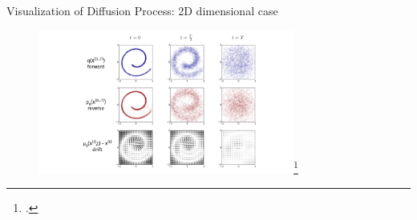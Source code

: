 \documentclass[aspectratio=169, 10pt]{beamer}
\theoremstyle{definition}
\begin{document}
\begin{frame}{Visualization of Diffusion Process: 2D dimensional case}
  \begin{figure}[h]
    \centering
    \includegraphics[width=0.75\textwidth]{./pic/summary-forw-reverse.png}\footcite{thermodynamic}
  \end{figure}
\end{frame}
\end{document}
